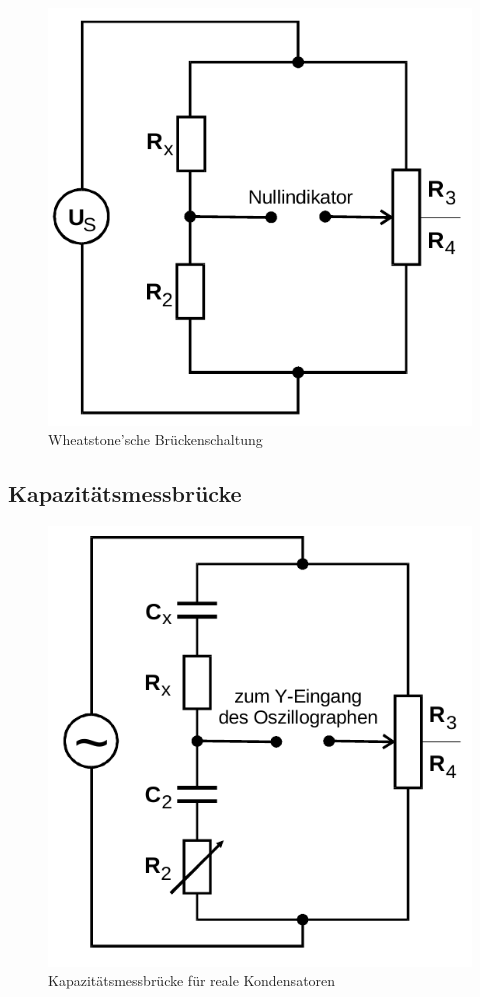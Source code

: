 \begin{figure}[H]
    \centering
    \includegraphics[scale=0.4]{pictures/2-wheatstone.png}
    \caption{Wheatstone'sche Brückenschaltung}
    \label{fig:wheatstone}
\end{figure}

\subsection{Kapazitätsmessbrücke}            
\label{sec:Cbrücke}

\begin{figure}[H]
    \centering
    \includegraphics[scale=0.4]{pictures/3-C.png}
    \caption{Kapazitätsmessbrücke für reale Kondensatoren}
    \label{fig:Cbrücke}
\end{figure}

